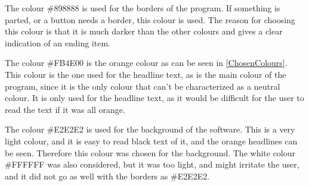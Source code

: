 The colour \#898888 is used for the borders of the program. If something is parted, or a button needs a border, this colour is used. The reason for choosing this colour is that it is much darker than the other colours and gives a clear indication of an ending item.

The colour \#FB4E00 is the orange colour as can be seen in \cref{ChosenColours}. This colour is the one used for the headline text, as is the main colour of the program, since it is the only colour that can't be characterized as a neutral colour. It is only used for the headline text, as it would be difficult for the user to read the text if it was all orange.

The colour \#E2E2E2 is used for the background of the software. This is a very light colour, and it is easy to read black text of it, and the orange headlines can be seen. Therefore this colour was chosen for the background. The white colour \#FFFFFF was also considered, but it was too light, and might irritate the user, and it did not go as well with the borders as \#E2E2E2.

